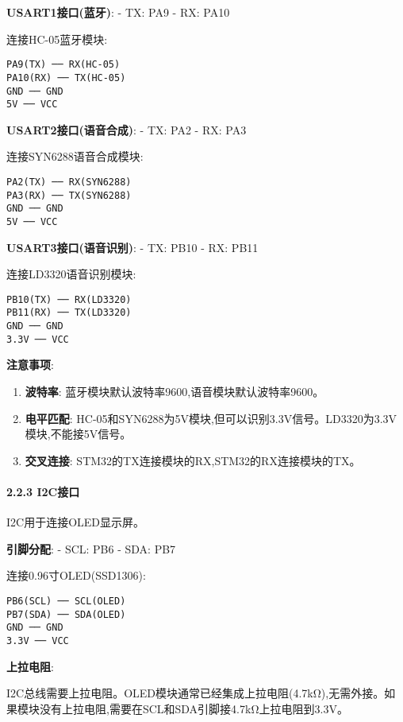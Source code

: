 \documentclass[
]{article}
\begin{document}
\textbf{USART1接口(蓝牙)}: - TX: PA9 - RX: PA10

连接HC-05蓝牙模块:

\begin{verbatim}
PA9(TX) ── RX(HC-05)
PA10(RX) ── TX(HC-05)
GND ── GND
5V ── VCC
\end{verbatim}

\textbf{USART2接口(语音合成)}: - TX: PA2 - RX: PA3

连接SYN6288语音合成模块:

\begin{verbatim}
PA2(TX) ── RX(SYN6288)
PA3(RX) ── TX(SYN6288)
GND ── GND
5V ── VCC
\end{verbatim}

\textbf{USART3接口(语音识别)}: - TX: PB10 - RX: PB11

连接LD3320语音识别模块:

\begin{verbatim}
PB10(TX) ── RX(LD3320)
PB11(RX) ── TX(LD3320)
GND ── GND
3.3V ── VCC
\end{verbatim}

\textbf{注意事项}:

\begin{enumerate}
\def\labelenumi{\arabic{enumi}.}
\item
  \textbf{波特率}: 蓝牙模块默认波特率9600,语音模块默认波特率9600。
\item
  \textbf{电平匹配}:
  HC-05和SYN6288为5V模块,但可以识别3.3V信号。LD3320为3.3V模块,不能接5V信号。
\item
  \textbf{交叉连接}: STM32的TX连接模块的RX,STM32的RX连接模块的TX。
\end{enumerate}

\hypertarget{i2cux63a5ux53e3}{%
\paragraph{2.2.3 I2C接口}\label{i2cux63a5ux53e3}}

I2C用于连接OLED显示屏。

\textbf{引脚分配}: - SCL: PB6 - SDA: PB7

连接0.96寸OLED(SSD1306):

\begin{verbatim}
PB6(SCL) ── SCL(OLED)
PB7(SDA) ── SDA(OLED)
GND ── GND
3.3V ── VCC
\end{verbatim}

\textbf{上拉电阻}:

I2C总线需要上拉电阻。OLED模块通常已经集成上拉电阻(4.7kΩ),无需外接。如果模块没有上拉电阻,需要在SCL和SDA引脚接4.7kΩ上拉电阻到3.3V。
\end{document}
